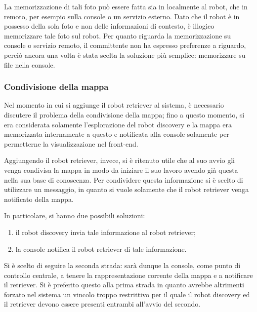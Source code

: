 La memorizzazione di tali foto può essere fatta sia in localmente al robot, che in remoto, per esempio sulla console o un servizio esterno.
Dato che il robot è in possesso della sola foto e non delle informazioni di contesto, è illogico memorizzare tale foto sul robot.
Per quanto riguarda la memorizzazione su console o servizio remoto, il committente non ha espresso preferenze a riguardo, perciò ancora una volta è stata scelta la soluzione più semplice:
memorizzare su file nella console.


\subsubsection{Condivisione della mappa}

Nel momento in cui si aggiunge il robot retriever al sistema, è necessario discutere il problema della condivisione della mappa;
fino a questo momento, si era considerata solamente l'esplorazione del robot discovery e la mappa era memorizzata internamente a questo e notificata alla console solamente per permetterne la visualizzazione nel front-end.

Aggiungendo il robot retriever, invece, si è ritenuto utile che al suo avvio gli venga condivisa la mappa in modo da iniziare il suo lavoro avendo già questa nella sua base di conoscenza.
Per condividere questa informazione si è scelto di utilizzare un messaggio, in quanto si vuole solamente che il robot retriever venga notificato della mappa.

In particolare, si hanno due possibili soluzioni:

\begin{enumerate}
  \item il robot discovery invia tale informazione al robot retriever;
  \item la console notifica il robot retriever di tale informazione.
\end{enumerate}

Si è scelto di seguire la seconda strada: sarà dunque la console, come punto di controllo centrale, a tenere la rappresentazione corrente della mappa e a notificare il retriever.
Si è preferito questo alla prima strada in quanto avrebbe altrimenti forzato nel sistema un vincolo troppo restrittivo per il quale il robot discovery ed il retriever devono essere presenti entrambi all'avvio del secondo.

